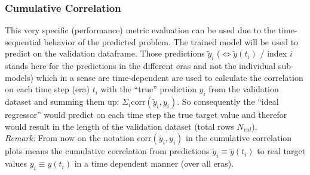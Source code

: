 \documentclass[12pt, a4paper]{article}
\begin{document}
\subsubsection{Cumulative Correlation}
This very specific (performance) metric evaluation can be used due to the time-sequential behavior of the predicted problem. The trained model will be used to predict on the validation dataframe. Those predictions $\tilde{y}_i$ ($\Leftrightarrow \tilde{y}(t_i)$ / index $i$ stands here for the predictions in the different eras and not the individual sub-models) which in a sense are time-dependent are used to calculate the correlation on each time step (era) $t_i$ with the ``true'' prediction $y_i$ from the validation dataset and summing them up: $\Sigma_i \text{corr}(\tilde{y}_i,y_i)$. So consequently the ``ideal regressor'' would predict on each time step the true target value and therefor would result in the length of the validation dataset (total rows $N_{val}$). \\
\textit{Remark: } From now on the notation $\text{corr}(\tilde{y}_i,y_i)$ in the cumulative correlation plots means the cumulative correlation from predictions $\tilde{y}_i \equiv \tilde{y}(t_i)$ to real target values $y_i \equiv y(t_i)$ in a time dependent manner (over all eras).
\newpage
\end{document}
